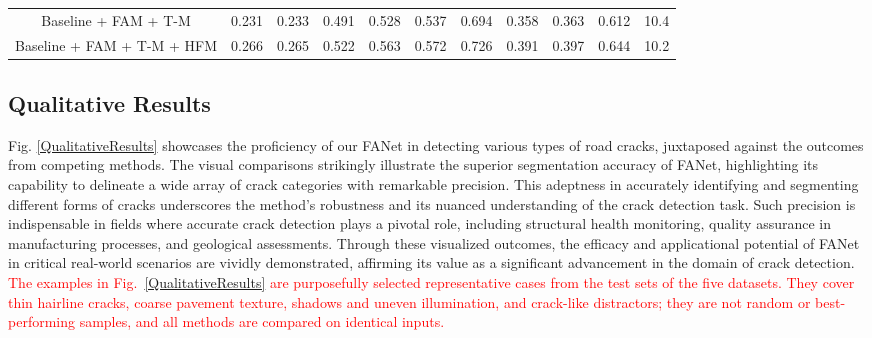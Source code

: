 \documentclass[journal]{IEEEtran}
\begin{document}
\begin{table}[!t]
\begin{tabular}{@{}c|ccc|ccc|ccc|c@{}}
Baseline + FAM + T-M              & 0.231                        & 0.233                        & 0.491                        & 0.528                        & 0.537                        & 0.694                        & 0.358                        & 0.363                        & 0.612                        & 10.4                           \\
Baseline + FAM + T-M + HFM        & {\color[HTML]{FE0000} 0.266} & {\color[HTML]{FE0000} 0.265} & {\color[HTML]{FE0000} 0.522} & {\color[HTML]{FE0000} 0.563} & {\color[HTML]{FE0000} 0.572} & {\color[HTML]{FE0000} 0.726} & {\color[HTML]{FE0000} 0.391} & {\color[HTML]{FE0000} 0.397} & {\color[HTML]{FE0000} 0.644} & 10.2    \\ \bottomrule
\end{tabular}
\label{abla}
\end{table}





\subsection{Qualitative Results} \label{sec:Qualitative-Results}
Fig. \ref{QualitativeResults} showcases the proficiency of our FANet in detecting various types of road cracks, juxtaposed against the outcomes from competing methods. The visual comparisons strikingly illustrate the superior segmentation accuracy of FANet, highlighting its capability to delineate a wide array of crack categories with remarkable precision. This adeptness in accurately identifying and segmenting different forms of cracks underscores the method's robustness and its nuanced understanding of the crack detection task. Such precision is indispensable in fields where accurate crack detection plays a pivotal role, including structural health monitoring, quality assurance in manufacturing processes, and geological assessments. Through these visualized outcomes, the efficacy and applicational potential of FANet in critical real-world scenarios are vividly demonstrated, affirming its value as a significant advancement in the domain of crack detection.
\textcolor{red}{The examples in Fig.~\ref{QualitativeResults} are purposefully selected representative cases from the test sets of the five datasets. They cover thin hairline cracks, coarse pavement texture, shadows and uneven illumination, and crack-like distractors; they are not random or best-performing samples, and all methods are compared on identical inputs.}
\end{document}
